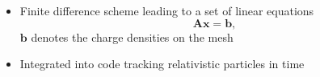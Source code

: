 \documentclass[xcolor=pdftex,table,10pt]{beamer}
\begin{document}
\begin{frame}
        \begin{itemize}
		\item Finite difference scheme leading to a set of linear equations
		\[
			\mathbf{A} \mathbf{x} = \mathbf{b} \text{,}
		\]
		$\textbf{b}$ denotes the charge densities on the mesh

        \item Integrated into code tracking relativistic particles in \alert{time}
        \end{itemize}

            
		


	\end{frame}
    
\end{document}
